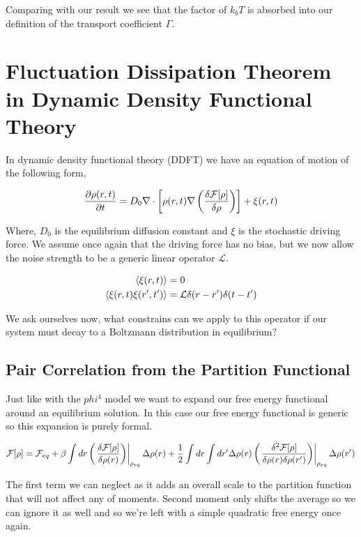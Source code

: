Comparing with our result we see that the factor of $k_bT$ is absorbed into our definition of the transport coefficient $\Gamma$.

\section{Fluctuation Dissipation Theorem in Dynamic Density Functional Theory}

In dynamic density functional theory (DDFT) we have an equation of motion of the following form, 

\begin{equation}
	\frac{\partial \rho(r, t)}{\partial t} = D_0 \nabla \cdot \left[\rho(r,t)\nabla \left(\frac{\delta \mathcal{F}[\rho]}{\delta \rho}\right)\right] + \xi(r, t)
\end{equation}

Where, $D_0$ is the equilibrium diffusion constant and $\xi$ is the stochastic driving force. We assume once again that the driving force has no bias, but we now allow the noise strength to be a generic linear operator $\mathcal{L}$.

\begin{align}
	\langle \xi(r,t) \rangle &= 0 \\
	\left\langle \xi(r, t) \xi(r^\prime, t^\prime) \right\rangle &= \mathcal{L} \delta (r-r^\prime) \delta (t -t^\prime)
\end{align}

We ask ourselves now, what constrains can we apply to this operator if our system must decay to a Boltzmann distribution in equilibrium?

\subsection{Pair Correlation from the Partition Functional}

Just like with the $phi^4$ model we want to expand our free energy functional around an equilibrium solution. In this case our free energy functional is generic so this expansion is purely formal. 

\begin{equation}
	\mathcal{F}[\rho] = \mathcal{F}_{eq} + \beta\int dr \left(\left.\frac{\delta \mathcal{F}[\rho]}{\delta \rho(r)}\right)\right\vert_{\rho_{eq}}\Delta\rho(r) + \frac{1}{2} \int dr \int dr^\prime \Delta\rho(r) \left(\left.\frac{\delta^2 \mathcal{F}[\rho]}{\delta \rho(r) \delta \rho(r^\prime)}\right)\right\vert_{\rho_{eq}} \Delta\rho(r^\prime)
\end{equation}

The first term we can neglect as it adds an overall scale to the partition function that will not affect any of moments. Second moment only shifts the average so we can ignore it as well and so we're left with a simple quadratic free energy once again. 

